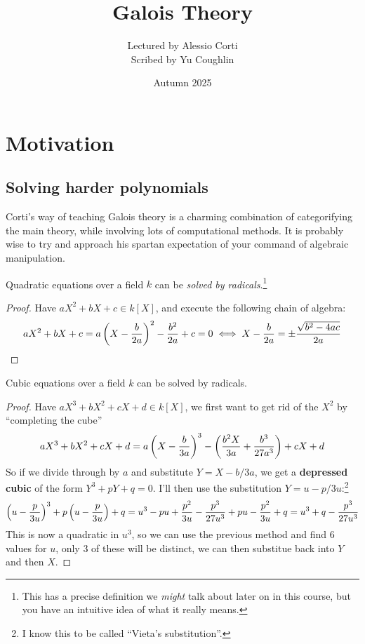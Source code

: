 \documentclass{article}
\begin{document}
\title{Galois Theory}
\author{Lectured by Alessio Corti \\
Scribed by Yu Coughlin}
\date{Autumn 2025}

\maketitle

\tableofcontents

\section{Motivation}

\subsection{Solving harder polynomials}

Corti's way of teaching Galois theory is a charming combination of categorifying the main theory, while involving lots of computational methods. It is probably wise to try and approach his spartan expectation of your command of algebraic manipulation.

\begin{proposition}
    Quadratic equations over a field $k$ can be \textit{solved by radicals}.\footnote{This has a precise definition we \textit{might} talk about later on in this course, but you have an intuitive idea of what it really means.}
    \begin{proof}
        Have $aX^2+bX+c\in k[X]$, and execute the following chain of algebra: \[
            aX^2 + bX + c = a\left( X-\frac{b}{2a} \right)^2-\frac{b^2}{2a} + c = 0 \iff X -\frac{b}{2a} = \pm\frac{\sqrt{b^2-4ac}}{2a}\qedhere
        \]
    \end{proof}
\end{proposition}

\begin{proposition}
    Cubic equations over a field $k$ can be solved by radicals.
    \begin{proof}
        Have $aX^3+bX^2+cX+d\in k[X]$, we first want to get rid of the $X^2$ by ``completing the cube''\[
        aX^3+bX^2+cX+d = a\left( X-\frac{b}{3a} \right)^3 - \left( \frac{b^2X}{3a} + \frac{b^3}{27a^3} \right) + cX + d 
        \] So if we divide through by $a$ and substitute $Y=X-b/3a$, we get a \textbf{depressed cubic} of the form $Y^3+pY+q=0$. I'll then use the substitution $Y = u - p/3u$:\footnote{I know this to be called ``Vieta's substitution''.} \[
        \left( u-\frac{p}{3u} \right)^3 + p\left( u-\frac{p}{3u} \right) + q = u^3 - pu + \frac{p^2}{3u} - \frac{p^3}{27u^3} + pu - \frac{p^2}{3u} + q = u^3 + q - \frac{p^3}{27u^3}
        \] This is now a quadratic in $u^3$, so we can use the previous method and find $6$ values for $u$, only $3$ of these will be distinct, we can then substitue back into $Y$ and then $X$.
    \end{proof}
\end{proposition}
\end{document}
